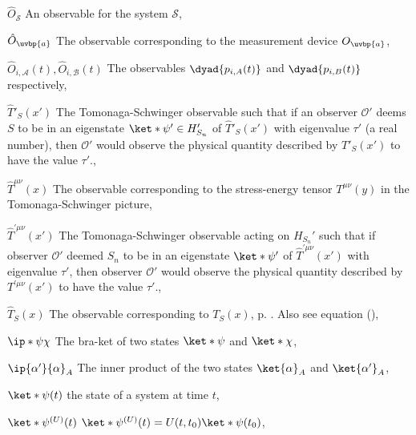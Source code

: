 \begin{thenomenclature}
  \item [{$\hat{O}_{\mathcal{S}}$}]\begingroup An observable for the system $\mathcal{S}$, \nomrefpage{}
  \item [{$\hat{O}_{\uvbp{a}}$}]\begingroup The observable corresponding to the measurement device $O_{\uvbp{a}}$, \nomrefpage{}
  \item [{$\hat{O}_{i,\mathcal{A}}(t), \hat{O}_{i,\mathcal{B}}(t)$}]\begingroup The observables $\dyad{p_{i,A}(t)}$ and $\dyad{p_{i,B}(t)}$ respectively,  \nomrefpage{}
  \item [{$\hat{T}'_S(x')$}]\begingroup The Tomonaga-Schwinger observable  such that if an observer $\mathcal{O}'$ deems $S$ to be in an eigenstate $\ket*{\psi'}\in H'_{S_n}$ of  $\hat{T}'_S(x')$ with eigenvalue $\tau'$ (a real number), then  $\mathcal{O}'$ would observe the physical quantity described by  $T'_S(x')$ to have the value $\tau'$., \nomrefpage{}
  \item [{$\hat{T}^{\mu\nu}(x)$}]\begingroup The observable corresponding to the stress-energy tensor $T^{\mu\nu}(y)$ in the Tomonaga-Schwinger picture, \nomrefpage{}
  \item [{$\hat{T}^{\prime\mu\nu}(x')$}]\begingroup The Tomonaga-Schwinger observable acting on $H_{S_n}'$ such that if observer $\mathcal{O}'$ deemed $S_n$ to be in an eigenstate $\ket*{\psi'}$ of  $\hat{T}^{\prime\mu\nu}(x')$ with eigenvalue $\tau'$, then observer $\mathcal{O}'$ would observe the physical quantity described by  $T^{\prime\mu\nu}(x')$ to have the value $\tau'$., \nomrefpage{}
  \item [{$\hat{T}_S(x)$}]\begingroup The observable corresponding to $T_S(x)$, p. \pageref{firstHatTS}. Also see equation (\pageref{TShat}), \nomrefpage{}
  \item [{$\ip*{\psi}{\chi}$}]\begingroup The bra-ket of two states $\ket*{\psi}$ and $\ket*{\chi}$, \nomrefpage{}
  \item [{$\ip{\alpha'}{\alpha}_A$}]\begingroup The inner product of the two states $\ket{\alpha}_A$ and $\ket{\alpha'}_A$, \nomrefpage{}
  \item [{$\ket *{\psi (t)}$}]\begingroup the state of a system at time $t$, \nomrefpage {}
  \item [{$\ket *{\psi ^{(U)}(t)}$}]\begingroup $\ket *{\psi ^{(U)}(t)}=U(t,t_0)\ket *{\psi (t_0)}$, \nomrefpage {}

\end{thenomenclature}
